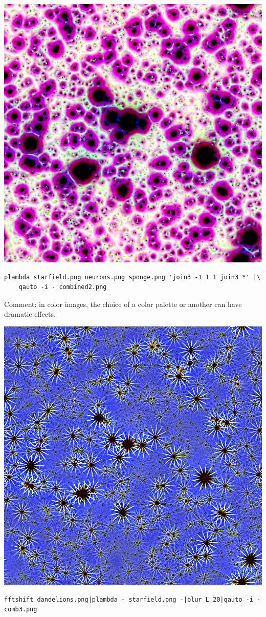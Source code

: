 \includegraphics{combined2.png}
\begin{verbatim}
plambda starfield.png neurons.png sponge.png 'join3 -1 1 1 join3 *' |\
	qauto -i - combined2.png
\end{verbatim}
Comment: in color images, the choice of a color palette or another can have dramatic effects.

\includegraphics{comb3.png}
\begin{verbatim}
fftshift dandelions.png|plambda - starfield.png -|blur L 20|qauto -i - comb3.png
\end{verbatim}

